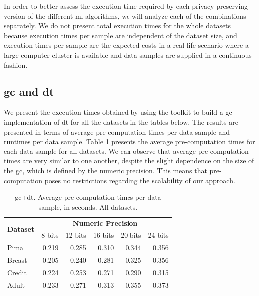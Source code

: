 In order to better assess the execution time required by each privacy-preserving version of the different \ac{ml} algorithms, we will analyze each of the combinations separately. We do not present total execution times for the whole datasets because execution times per sample are independent of the dataset size, and execution times per sample are the expected costs in a real-life scenario where a large computer cluster is available and data samples are supplied in a continuous fashion.


\subsection{\acl{gc} and \acl{dt}}

We present the execution times obtained by using the toolkit to build a \ac{gc} implementation of \ac{dt} for all the datasets in the tables below. The results are presented in terms of average pre-computation times per data sample and runtimes per data sample. Table \ref{table:avgDTAllDatasets} presents the average pre-computation times for each data sample for all datasets. We can observe that average pre-computation times are very similar to one another, despite the slight dependence on the size of the \ac{gc}, which is defined by the numeric precision. This means that pre-computation poses no restrictions regarding the scalability of our approach.


\begin{table}[htp]
\centering
\caption{\acs{gc}+\acs{dt}. Average pre-computation times per data sample, in seconds. All datasets.}
\label{table:avgDTAllDatasets}
\vspace*{0.2cm}
\begin{tabular}{|l|r|r|r|r|r|}
\hline
\multicolumn{1}{|c|}{\multirow{2}{*}{\textbf{Dataset}}} & \multicolumn{5}{c|}{\textbf{Numeric Precision}}                                             \\ \cline{2-6} 
\multicolumn{1}{|c|}{}                                  & 8 bits & 12 bits & 16 bits & 20 bits & 24 bits \\ \hline
Pima                                                    & 0.219           & 0.285            & 0.310            & 0.344            & 0.356            \\ \hline
Breast                                                  & 0.205           & 0.240            & 0.281            & 0.325            & 0.356            \\ \hline
Credit                                                  & 0.224           & 0.253            & 0.271            & 0.290            & 0.315            \\ \hline
Adult                                                   & 0.233           & 0.271            & 0.313            & 0.355            & 0.373            \\ \hline
\end{tabular}
\end{table}



